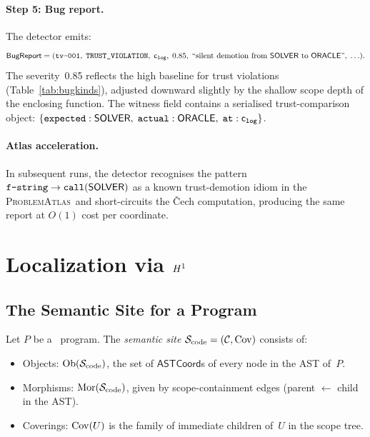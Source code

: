 \documentclass[11pt]{article}
\newcommand{\BugRep}{\ensuremath{\mathsf{BugReport}}}          %
\newcommand{\ProbAtlas}{\textsc{ProblemAtlas}}    %
\newcommand{\SemSite}{\mathcal{S}_{\mathrm{code}}}%
\newcommand{\ASTCoord}{\ensuremath{\mathsf{ASTCoord}}}         %
\begin{document}
\paragraph{Step 5: Bug report.}
The detector emits:
\[
  \BugRep = (\texttt{tv-001},\;\texttt{TRUST\_VIOLATION},\;
    \coord_{\mathtt{log}},\;0.85,\;
    \text{``silent demotion from } \Tsolver \text{ to } \Toracle\text{''},\;
    \ldots).
\]
The severity~0.85 reflects the high baseline for trust violations
(Table~\ref{tab:bugkinds}), adjusted downward slightly by the shallow
scope depth of the enclosing function.  The witness field contains a
serialised trust-comparison object:
$\{\texttt{expected}: \mathsf{SOLVER},\; \texttt{actual}: \mathsf{ORACLE},\;
\texttt{at}: \mathsf{c}_{\mathtt{log}}\}$.

\paragraph{Atlas acceleration.}
In subsequent runs, the detector recognises the pattern
$\texttt{f-string} \to \texttt{call}(\mathsf{SOLVER})$ as a known trust-demotion
idiom in the \ProbAtlas\ and short-circuits the \v{C}ech computation,
producing the same report at $O(1)$ cost per coordinate.

\section{Localization via \texorpdfstring{$H^{1}$}{H1}}\label{sec:h1}

\subsection{The Semantic Site for a Program}

\begin{definition}\label{def:semsite}
Let $P$ be a \Python\ program.  The \emph{semantic site}
$\SemSite = (\mathcal{C}, \Cov)$ consists of:
\begin{itemize}[leftmargin=2em,topsep=2pt]
  \item Objects: $\Ob(\SemSite)$, the set of \ASTCoord{}s of every node
    in the AST of~$P$.
  \item Morphisms: $\Mor(\SemSite)$, given by scope-containment edges
    (parent $\leftarrow$ child in the AST).
  \item Coverings: $\mathrm{Cov}(U)$ is the family of immediate children of~$U$ in
    the scope tree.
\end{itemize}
\end{definition}
\end{document}
